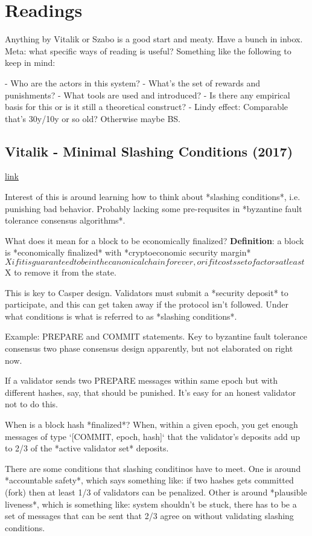 \documentclass[12pt]{report}
\newcommand{\link}[2]{\href{#1}{#2}}
\begin{document}
\chapter{Readings}

Anything by Vitalik or Szabo is a good start and meaty. Have a bunch in inbox.
Meta: what specific ways of reading is useful? Something like the following to
keep in mind:

- Who are the actors in this system?
- What's the set of rewards and punishments?
- What tools are used and introduced?
- Is there any empirical basis for this or is it still a theoretical construct?
- Lindy effect: Comparable that's 30y/10y or so old? Otherwise maybe BS.

\section{Vitalik - Minimal Slashing Conditions (2017)}
\link{https://medium.com/@VitalikButerin/minimal-slashing-conditions-20f0b500fc6c}{link}

Interest of this is around learning how to think about *slashing conditions*,
i.e. punishing bad behavior. Probably lacking some pre-requsites in *byzantine
fault tolerance consensus algorithms*.

What does it mean for a block to be economically finalized?
\textbf{Definition}: a block is *economically finalized* with *cryptoeconomic
security margin* $X if it is guaranteed to be in the canonical chain for ever,
or if it costs set of actors at least $X to remove it from the state.

This is key to Casper design. Validators must submit a *security deposit* to
participate, and this can get taken away if the protocol isn't followed. Under
what conditions is what is referred to as *slashing conditions*.

Example: PREPARE and COMMIT statements. Key to byzantine fault tolerance
consensus two phase consensus design apparently, but not elaborated on right
now.

If a validator sends two PREPARE messages within same epoch but with different
hashes, say, that should be punished. It's easy for an honest validator not to
do this.

When is a block hash *finalized*?
When, within a given epoch, you get enough messages of type `[COMMIT, epoch,
  hash]` that the validator's deposits add up to 2/3 of the *active validator
set* deposits.

There are some conditions that slashing conditinos have to meet. One is around
*accountable safety*, which says something like: if two hashes gets committed (fork) then
at least 1/3 of validators can be penalized. Other is around *plausible liveness*, which
is something like: system shouldn't be stuck, there has to be a set of messages
that can be sent that 2/3 agree on without validating slashing conditions.
\end{document}

